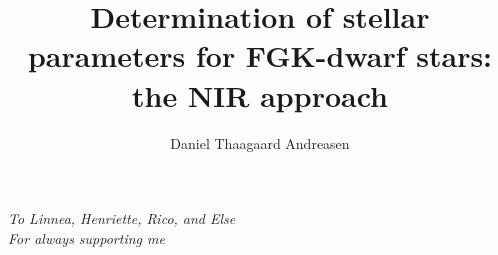 \documentclass[fleqn]{fcup-thesis}
\author{Daniel Thaagaard Andreasen}
\title{Determination of stellar parameters for FGK-dwarf stars: the NIR approach}
\begin{document}
\begin{preliminary}

\maketitle

\cleardoublepage


\begin{dedication}
\centering \huge \itshape
To Linnea, Henriette, Rico, and Else\\For always supporting me
\end{dedication}

\begin{acknowledgements}
\lipsum[1-2]
\end{acknowledgements}



\begin{abstract}
\lipsum[2]
\end{abstract}

\begin{abstract-pt}
\lipsum[2]
\end{abstract-pt}





\tableofcontents

\listoftables


\end{preliminary}
\end{document}
